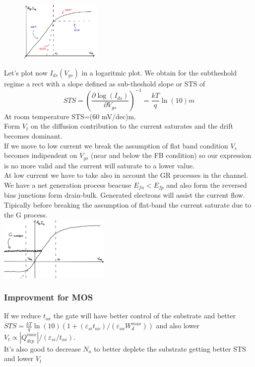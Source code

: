 \begin{figure}
\includegraphics[width=0.35\textwidth]{tranclog.png}
\end{figure}

Let's plot now $I_{ds}(V_{gs})$ in a logaritmic plot. We obtain for the subtheshold regime a rect with a slope defined as sub-theshold slope or STS of 
\begin{equation}
STS=\left(\frac{\partial \log(I_{ds})}{\partial V_{gs}}\right)^{-1}=\frac{kT}{q}\ln(10)m
\end{equation} 
At room temperature STS=(60 mV/dec)m.\\ 
Form $V_t$ on the diffusion contribution to the current saturates and the drift becomes dominant.\\
If we move to low current we break the assumption of flat band condition $V_s$ becomes indipendent on $V_{gs}$ (near and below the FB condition) so our expression is no more valid and the current will saturate to a lower value.\\
At low current we have to take also in account the GR processes in the channel. We have a net generation process beacuse $E_{fn}<E_{fp}$ and also form the reversed bias junctions form drain-bulk. Generated electrons will assist the current flow. Tipically before breaking the assumption of flat-band the current saturate due to the G process.\\

\centering
\includegraphics[width=0.4\textwidth]{noisefloor.png}\\
\raggedright

\subsubsection{Improvment for MOS}
If we reduce $t_{ox}$ the gate will have better control of the substrate and better $STS=\frac{kT}{q}\ln(10)(1+(\varepsilon_{si}t_{ox})/(\varepsilon_{ox}W_d^{max}))$ and also lower $V_t\propto|Q_{dep}^{max}|/(\varepsilon_{si}/t_{ox})$.\\
It's also good to decrease $N_a$ to better deplete the substrate getting better STS and lower $V_t$


